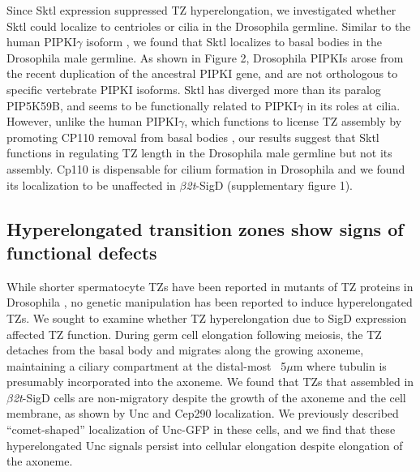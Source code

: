 \documentclass[12pt, twoside, letterpaper]{article}
\newcommand{\sigd}{$\beta$\textit{2t}-SigD}
\begin{document}
Since Sktl expression suppressed TZ hyperelongation,
we investigated whether Sktl could localize to centrioles or cilia in the Drosophila germline.
Similar to the human PIPKI$\gamma$ isoform \citep{xu2014pipkigamma},
we found that Sktl localizes to basal bodies in the Drosophila male germline.
As shown in Figure 2, Drosophila PIPKIs arose from the recent duplication of
the ancestral PIPKI gene, and are not orthologous to specific vertebrate PIPKI isoforms.
Sktl has diverged more than its paralog PIP5K59B, and seems
to be functionally related to PIPKI$\gamma$ in its roles at cilia.
However, unlike the human PIPKI$\gamma$, which functions to license TZ assembly
by promoting CP110 removal from basal bodies \citep{xu2016phosphatidylinositol},
our results suggest that Sktl functions in
regulating TZ length in the Drosophila male germline
but not its assembly.
Cp110 is dispensable for cilium formation in Drosophila \citep{franz2013cp110}
and we found its localization to be unaffected in \sigd{} (supplementary figure 1).

\subsection{Hyperelongated transition zones show signs of functional defects}
While shorter spermatocyte TZs have been reported in mutants of TZ proteins in Drosophila
\citep{vieillard2016transition, pratt2016drosophila},
no genetic manipulation has been reported to induce hyperelongated TZs. 
We sought to examine whether TZ hyperelongation due to SigD expression
affected TZ function.
During germ cell elongation following meiosis, the TZ detaches from
the basal body and migrates along the growing axoneme, maintaining a ciliary compartment
at the distal-most ~5$\mu$m where tubulin is presumably incorporated into the axoneme.
We found that
TZs that assembled in \sigd{} cells are non-migratory despite the growth of the
axoneme and the cell membrane, as shown by Unc and Cep290 localization.
We previously described ``comet-shaped'' localization of Unc-GFP in these cells,
and we find that these hyperelongated Unc signals persist into cellular elongation
despite elongation of the axoneme.
\end{document}

